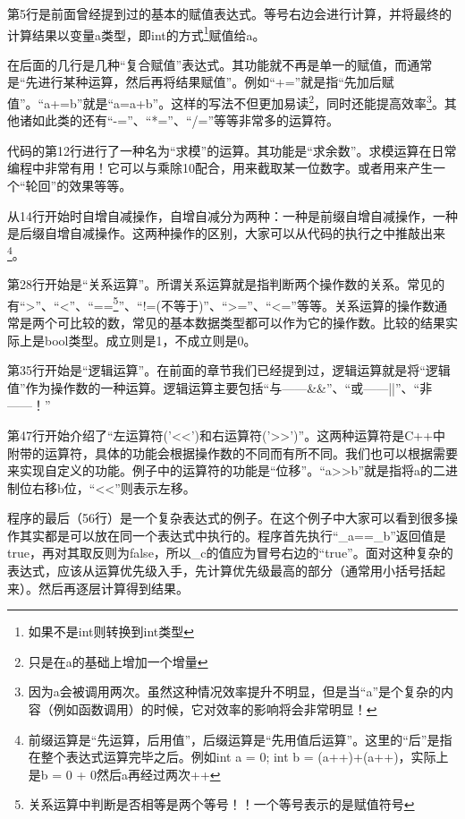 第5行是前面曾经提到过的基本的赋值表达式。等号右边会进行计算，并将最终的计算结果以变量a类型，即int的方式\footnote{如果不是int则转换到int类型}赋值给a。

在后面的几行是几种“复合赋值”表达式。其功能就不再是单一的赋值，而通常是“先进行某种运算，然后再将结果赋值”。例如“+=”就是指“先加后赋值”。“a+=b”就是“a=a+b”。这样的写法不但更加易读\footnote{只是在a的基础上增加一个增量}，同时还能提高效率\footnote{因为a会被调用两次。虽然这种情况效率提升不明显，但是当“a”是个复杂的内容（例如函数调用）的时候，它对效率的影响将会非常明显！}。其他诸如此类的还有“-=”、“*=”、“/=”等等非常多的运算符。

代码的第12行进行了一种名为“求模”的运算。其功能是“求余数”。求模运算在日常编程中非常有用！它可以与乘除10配合，用来截取某一位数字。或者用来产生一个“轮回”的效果等等。

从14行开始时自增自减操作，自增自减分为两种：一种是前缀自增自减操作，一种是后缀自增自减操作。这两种操作的区别，大家可以从代码的执行之中推敲出来\footnote{前缀运算是“先运算，后用值”，后缀运算是“先用值后运算”。这里的“后”是指在整个表达式运算完毕之后。例如int a = 0; int b = (a++)+(a++)，实际上是b = 0 + 0然后a再经过两次++}。

第28行开始是“关系运算”。所谓关系运算就是指判断两个操作数的关系。常见的有“>”、“<”、“==\footnote{关系运算中判断是否相等是两个等号！！一个等号表示的是赋值符号}”、“!=(不等于)”、“>=”、“<=”等等。关系运算的操作数通常是两个可比较的数，常见的基本数据类型都可以作为它的操作数。比较的结果实际上是bool类型。成立则是1，不成立则是0。

第35行开始是“逻辑运算”。在前面的章节我们已经提到过，逻辑运算就是将“逻辑值”作为操作数的一种运算。逻辑运算主要包括“与——\&\&”、“或——||”、“非——！”

第47行开始介绍了“左运算符('<<')和右运算符('>>')”。这两种运算符是C++中附带的运算符，具体的功能会根据操作数的不同而有所不同。我们也可以根据需要来实现自定义的功能。例子中的运算符的功能是“位移”。“a>>b”就是指将a的二进制位右移b位，“<<”则表示左移。

程序的最后（56行）是一个复杂表达式的例子。在这个例子中大家可以看到很多操作其实都是可以放在同一个表达式中执行的。程序首先执行“\_a==\_b”返回值是true，再对其取反则为false，所以\_c的值应为冒号右边的“true”。面对这种复杂的表达式，应该从运算优先级入手，先计算优先级最高的部分（通常用小括号括起来）。然后再逐层计算得到结果。

